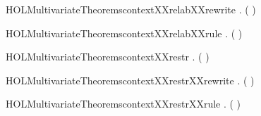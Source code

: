 \newcommand{\HOLMultivariateTheoremscontextXXrelab}{\UseVerbatim{HOLMultivariateTheoremscontextXXrelab}}
\begin{SaveVerbatim}{HOLMultivariateTheoremscontextXXrelabXXrewrite}
\HOLTokenTurnstile{} \HOLSymConst{\HOLTokenForall{}}  .   (  ) \HOLSymConst{\HOLTokenEquiv{}}   
\end{SaveVerbatim}
\newcommand{\HOLMultivariateTheoremscontextXXrelabXXrewrite}{\UseVerbatim{HOLMultivariateTheoremscontextXXrelabXXrewrite}}
\begin{SaveVerbatim}{HOLMultivariateTheoremscontextXXrelabXXrule}
\HOLTokenTurnstile{} \HOLSymConst{\HOLTokenForall{}}  .    \HOLSymConst{\HOLTokenImp{}}   (  )
\end{SaveVerbatim}
\newcommand{\HOLMultivariateTheoremscontextXXrelabXXrule}{\UseVerbatim{HOLMultivariateTheoremscontextXXrelabXXrule}}
\begin{SaveVerbatim}{HOLMultivariateTheoremscontextXXrestr}
\HOLTokenTurnstile{} \HOLSymConst{\HOLTokenForall{}}  .   (\HOLConst{\ensuremath{\nu}}  ) \HOLSymConst{\HOLTokenImp{}}   
\end{SaveVerbatim}
\newcommand{\HOLMultivariateTheoremscontextXXrestr}{\UseVerbatim{HOLMultivariateTheoremscontextXXrestr}}
\begin{SaveVerbatim}{HOLMultivariateTheoremscontextXXrestrXXrewrite}
\HOLTokenTurnstile{} \HOLSymConst{\HOLTokenForall{}}  .   (\HOLConst{\ensuremath{\nu}}  ) \HOLSymConst{\HOLTokenEquiv{}}   
\end{SaveVerbatim}
\newcommand{\HOLMultivariateTheoremscontextXXrestrXXrewrite}{\UseVerbatim{HOLMultivariateTheoremscontextXXrestrXXrewrite}}
\begin{SaveVerbatim}{HOLMultivariateTheoremscontextXXrestrXXrule}
\HOLTokenTurnstile{} \HOLSymConst{\HOLTokenForall{}}  .    \HOLSymConst{\HOLTokenImp{}}   (\HOLConst{\ensuremath{\nu}}  )
\end{SaveVerbatim}
